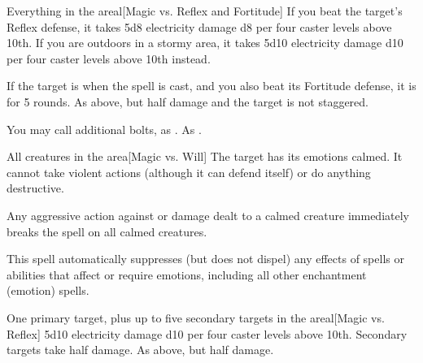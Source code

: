 \begin{spelltargets}{Everything in the area}l[Magic vs. Reflex and Fortitude]
    \spellsuccess If you beat the target's Reflex defense, it takes 5d8 electricity damage \add d8 per four caster levels above 10th. If you are outdoors in a stormy area, it takes 5d10 electricity damage \add d10 per four caster levels above 10th instead.

    If the target is \bloodied when the spell is cast, and you also beat its Fortitude defense, it is \staggered for 5 rounds.
    \spellfailure As above, but half damage and the target is not staggered.
\end{spelltargets}
\spelleffect You may call additional bolts, as .
\spellnotes As .

\begin{spelltargets}{All creatures in the area}[Magic vs. Will]
    \spellsuccess The target has its emotions calmed. It cannot take violent actions (although it can defend itself) or do anything destructive.
\end{spelltargets}
\spellnotes Any aggressive action against or damage dealt to a calmed creature immediately breaks the spell on all calmed creatures.

This spell automatically suppresses (but does not dispel) any effects of spells or abilities that affect or require emotions, including all other enchantment (emotion) spells.

\spellrng{\rngmed}
\begin{spelltargets}{One primary target, plus up to five secondary targets in the area}l[Magic vs. Reflex]
    \spellsuccess 5d10 electricity damage \add d10 per four caster levels above 10th. Secondary targets take half damage.
    \spellfailure As above, but half damage.
\end{spelltargets}

